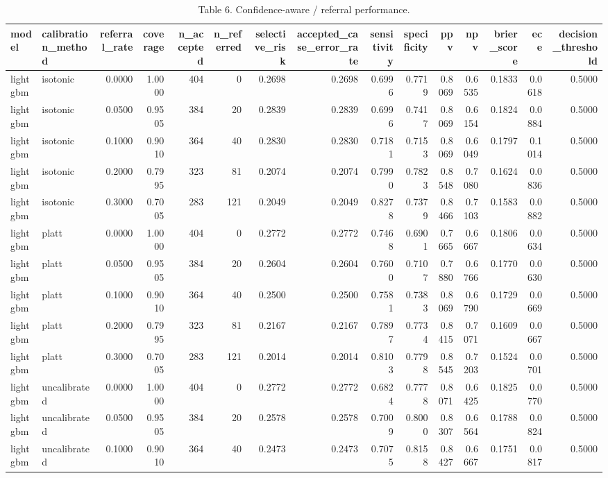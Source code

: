 \begin{table}[htbp]
\centering
\caption{Table 6. Confidence-aware / referral performance.}
\label{table6_referral_performance}
\begin{tabular}{llrrrrrrrrrrrrr}
\toprule
model & calibration\_method & referral\_rate & coverage & n\_accepted & n\_referred & selective\_risk & accepted\_case\_error\_rate & sensitivity & specificity & ppv & npv & brier\_score & ece & decision\_threshold \\
\midrule
lightgbm & isotonic & 0.0000 & 1.0000 & 404 & 0 & 0.2698 & 0.2698 & 0.6996 & 0.7719 & 0.8069 & 0.6535 & 0.1833 & 0.0618 & 0.5000 \\
lightgbm & isotonic & 0.0500 & 0.9505 & 384 & 20 & 0.2839 & 0.2839 & 0.6996 & 0.7417 & 0.8069 & 0.6154 & 0.1824 & 0.0884 & 0.5000 \\
lightgbm & isotonic & 0.1000 & 0.9010 & 364 & 40 & 0.2830 & 0.2830 & 0.7181 & 0.7153 & 0.8069 & 0.6049 & 0.1797 & 0.1014 & 0.5000 \\
lightgbm & isotonic & 0.2000 & 0.7995 & 323 & 81 & 0.2074 & 0.2074 & 0.7990 & 0.7823 & 0.8548 & 0.7080 & 0.1624 & 0.0836 & 0.5000 \\
lightgbm & isotonic & 0.3000 & 0.7005 & 283 & 121 & 0.2049 & 0.2049 & 0.8278 & 0.7379 & 0.8466 & 0.7103 & 0.1583 & 0.0882 & 0.5000 \\
lightgbm & platt & 0.0000 & 1.0000 & 404 & 0 & 0.2772 & 0.2772 & 0.7468 & 0.6901 & 0.7665 & 0.6667 & 0.1806 & 0.0634 & 0.5000 \\
lightgbm & platt & 0.0500 & 0.9505 & 384 & 20 & 0.2604 & 0.2604 & 0.7600 & 0.7107 & 0.7880 & 0.6766 & 0.1770 & 0.0630 & 0.5000 \\
lightgbm & platt & 0.1000 & 0.9010 & 364 & 40 & 0.2500 & 0.2500 & 0.7581 & 0.7383 & 0.8069 & 0.6790 & 0.1729 & 0.0669 & 0.5000 \\
lightgbm & platt & 0.2000 & 0.7995 & 323 & 81 & 0.2167 & 0.2167 & 0.7897 & 0.7734 & 0.8415 & 0.7071 & 0.1609 & 0.0667 & 0.5000 \\
lightgbm & platt & 0.3000 & 0.7005 & 283 & 121 & 0.2014 & 0.2014 & 0.8103 & 0.7798 & 0.8545 & 0.7203 & 0.1524 & 0.0701 & 0.5000 \\
lightgbm & uncalibrated & 0.0000 & 1.0000 & 404 & 0 & 0.2772 & 0.2772 & 0.6824 & 0.7778 & 0.8071 & 0.6425 & 0.1825 & 0.0770 & 0.5000 \\
lightgbm & uncalibrated & 0.0500 & 0.9505 & 384 & 20 & 0.2578 & 0.2578 & 0.7009 & 0.8000 & 0.8307 & 0.6564 & 0.1788 & 0.0824 & 0.5000 \\
lightgbm & uncalibrated & 0.1000 & 0.9010 & 364 & 40 & 0.2473 & 0.2473 & 0.7075 & 0.8158 & 0.8427 & 0.6667 & 0.1751 & 0.0817 & 0.5000 \\

\end{tabular}
\end{table}
